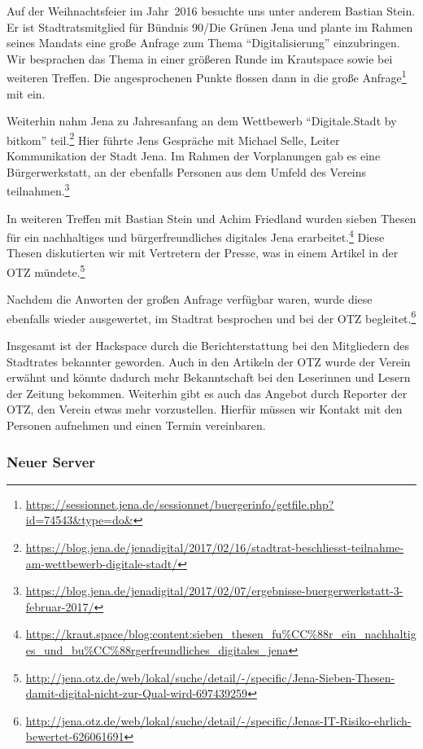 \documentclass[ngerman]{scrartcl}
\begin{document}
Auf der Weihnachtsfeier im Jahr~2016 besuchte uns unter anderem Bastian
Stein. Er ist Stadtratsmitglied für Bündnis 90/Die Grünen Jena und plante im
Rahmen seines Mandats eine große Anfrage zum Thema \enquote{Digitalisierung}
einzubringen. Wir besprachen das Thema in einer größeren Runde im Krautspace
sowie bei weiteren Treffen. Die angesprochenen Punkte flossen dann in die große
Anfrage\footnote{\url{https://sessionnet.jena.de/sessionnet/buergerinfo/getfile.php?id=74543&type=do&}}
mit ein.

Weiterhin nahm Jena zu Jahresanfang an dem Wettbewerb \enquote{Digitale.Stadt by
bitkom}
teil.\footnote{\url{https://blog.jena.de/jenadigital/2017/02/16/stadtrat-beschliesst-teilnahme-am-wettbewerb-digitale-stadt/}}
Hier führte Jens Gespräche mit Michael Selle, Leiter Kommunikation der Stadt
Jena. Im Rahmen der Vorplanungen gab es eine Bürgerwerkstatt, an der ebenfalls
Personen aus dem Umfeld des Vereins
teilnahmen.\footnote{\url{https://blog.jena.de/jenadigital/2017/02/07/ergebnisse-buergerwerkstatt-3-februar-2017/}}

In weiteren Treffen mit Bastian Stein und Achim Friedland wurden sieben Thesen
für ein nachhaltiges und bürgerfreundliches digitales Jena
erarbeitet.\footnote{\url{https://kraut.space/blog:content:sieben_thesen_fu\%CC\%88r_ein_nachhaltiges_und_bu\%CC\%88rgerfreundliches_digitales_jena}}
Diese Thesen diskutierten wir mit Vertretern der Presse, was in einem Artikel in
der OTZ
mündete.\footnote{\url{http://jena.otz.de/web/lokal/suche/detail/-/specific/Jena-Sieben-Thesen-damit-digital-nicht-zur-Qual-wird-697439259}}

Nachdem die Anworten der großen Anfrage verfügbar waren, wurde diese ebenfalls
wieder ausgewertet, im Stadtrat besprochen und bei der OTZ
begleitet.\footnote{\url{http://jena.otz.de/web/lokal/suche/detail/-/specific/Jenas-IT-Risiko-ehrlich-bewertet-626061691}}

Insgesamt ist der Hackspace durch die Berichterstattung bei den Mitgliedern des
Stadtrates bekannter geworden. Auch in den Artikeln der OTZ wurde der Verein
erwähnt und könnte dadurch mehr Bekanntschaft bei den Leserinnen und Lesern der
Zeitung bekommen. Weiterhin gibt es auch das Angebot durch Reporter der OTZ, den
Verein etwas mehr vorzustellen. Hierfür müssen wir Kontakt mit den Personen
aufnehmen und einen Termin vereinbaren.

\subsubsection{Neuer Server}
\end{document}
